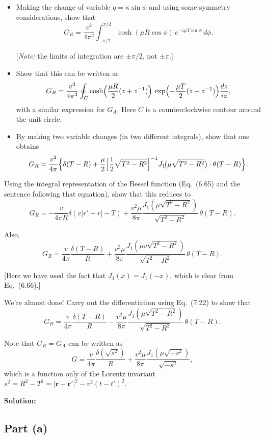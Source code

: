 \documentclass[12pt]{article}
\begin{document}
\begin{itemize}
\item[d)] Making the change of variable $q = \kappa\sin\phi$ and using some symmetry considerations, show that
\[
G_R = \frac{v^2}{4\pi^2}\int_{-\pi/2}^{\pi/2}\cosh(\mu R\cos\phi)\,e^{-i\mu T\sin\phi}\,d\phi.
\]

[\textit{Note:} the limits of integration are $\pm\pi/2$, not $\pm\pi$.]

\item[e)] Show that this can be written as
\[
G_R = \frac{v^2}{4\pi^2}\oint_C \cosh\Bigl(\frac{\mu R}{2}(z+z^{-1})\Bigr)\,\exp\Bigl(-\frac{\mu T}{2}(z-z^{-1})\Bigr)\frac{dz}{iz},
\]
with a similar expression for $G_A$. Here $C$ is a counterclockwise contour around the unit circle.

\item[f)] By making two variable changes (in two different integrals), show that one obtains
\[
G_R = \frac{v^2}{4\pi}\Bigl\{\delta(T-R) + \frac{\mu}{2}\Bigl[\frac{1}{2}\sqrt{T^2-R^2}\Bigr]^{-1}J_1\!\bigl(\mu\sqrt{T^2-R^2}\bigr)\cdot\theta(T-R)\Bigr\}.
\]
\end{itemize}

Using the integral representation of the Bessel function (Eq.\ (6.65) and the sentence following that equation), show that this reduces to
\[
G_R = -\frac{v}{4\pi R}\delta(v|r'-r| - T) + \frac{v^2\mu}{8\pi}\frac{J_1(\mu\sqrt{T^2-R^2})}{\sqrt{T^2-R^2}}\,\theta(T-R).
\]

Also,
\[
G_R = \frac{v}{4\pi}\frac{\delta(T-R)}{R} + \frac{v^2\mu}{8\pi}\frac{J_1(\mu v\sqrt{T^2-R^2})}{\sqrt{T^2-R^2}}\,\theta(T-R).
\]

[Here we have used the fact that $J_1(x) = J_1(-x)$, which is clear from Eq.\ (6.66).]

We're almost done! Carry out the differentiation using Eq.\ (7.22) to show that
\[
G_R = \frac{v}{4\pi}\frac{\delta(T-R)}{R} - \frac{v^2\mu}{8\pi}\frac{J_1(\mu\sqrt{T^2-R^2})}{\sqrt{T^2-R^2}}\,\theta(T-R).
\]

Note that $G_R = G_A$ can be written as
\[
G = \frac{v}{4\pi}\frac{\delta(\sqrt{s^2})}{R} + \frac{v^2\mu}{8\pi}\frac{J_1(\mu\sqrt{-s^2})}{\sqrt{-s^2}},
\]
which is a function only of the Lorentz invariant $s^2 = R^2 - T^2 = |\mathbf{r}-\mathbf{r}'|^2 - v^2(t-t')^2$.

\bigskip
\textbf{Solution:}

\subsection*{Part (a)}
\end{document}
